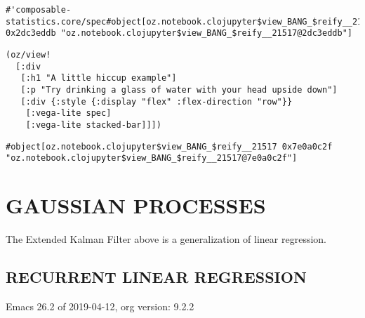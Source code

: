 \documentclass[10pt,oneside,x11names]{article}
\begin{document}
\begin{verbatim}
#'composable-statistics.core/spec#object[oz.notebook.clojupyter$view_BANG_$reify__21517 0x2dc3eddb "oz.notebook.clojupyter$view_BANG_$reify__21517@2dc3eddb"]
\end{verbatim}


\begin{verbatim}
(oz/view!
  [:div
   [:h1 "A little hiccup example"]
   [:p "Try drinking a glass of water with your head upside down"]
   [:div {:style {:display "flex" :flex-direction "row"}}
    [:vega-lite spec]
    [:vega-lite stacked-bar]]])
\end{verbatim}

\begin{verbatim}
#object[oz.notebook.clojupyter$view_BANG_$reify__21517 0x7e0a0c2f "oz.notebook.clojupyter$view_BANG_$reify__21517@7e0a0c2f"]
\end{verbatim}

\section{GAUSSIAN PROCESSES}
\label{gaussian-processes}
The Extended Kalman Filter above is a generalization of linear
regression.

\subsection{RECURRENT LINEAR REGRESSION}
\label{recurrent-linear-regression}
Emacs 26.2 of 2019-04-12, org version: 9.2.2
\end{document}
